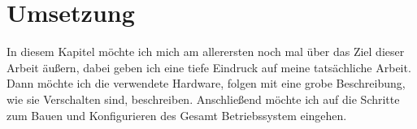\chapter{Umsetzung}
\label{cha:umsetzung}
In diesem Kapitel möchte ich mich am allerersten noch mal über das Ziel dieser Arbeit äußern, dabei geben ich eine tiefe Eindruck auf meine tatsächliche Arbeit. Dann möchte ich die verwendete Hardware, folgen mit eine grobe Beschreibung, wie sie Verschalten sind, beschreiben. Anschließend möchte ich auf die Schritte zum Bauen und Konfigurieren des Gesamt Betriebssystem eingehen.